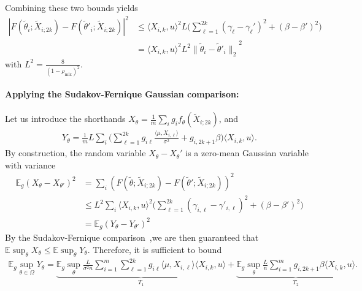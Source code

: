 \documentclass[twoside,11pt]{article}
\def\EE{ \mathbb{E} }
\newcommand{\norm}[1]{\ensuremath{\|#1\|_2}}
\newcommand{\mixcoef}{\ensuremath{\rho_{\mathrm{mix}}}}
\newcommand{\paramobs}{\mu}
\newcommand{\paramtrans}{\beta}
\newcommand{\paramjoint}{\theta}
\newcommand{\paramspacejoint}{\DomTheta}
\newcommand{\paramgamma}{\gamma}
\newcommand{\DomTheta}{\ensuremath{\Omega}}
\newcommand{\Xtil}{\ensuremath{\widetilde{X}}}
\newcommand{\funcproc}{f_{\paramjoint}}
\newcommand{\funcprocgamma}[1]{F(#1;\blockXi)}
\newcommand{\blockXi}{\Xtil_{i;2k}}
\newcommand{\lipcont}{\ensuremath{L}}
\newcommand{\paramjointgamma}{\tilde{\paramjoint}}
\begin{document}
Combining these two bounds yields
\begin{align*}
|\funcprocgamma{\paramjointgamma_i} -
\funcprocgamma{\paramjointgamma'_i}|^2 &\leq \langle X_{i,k},u
\rangle^2 \lipcont \big(\sum_{\ell=1}^{2k} (\paramgamma_\ell -
\paramgamma_\ell')^2 + (\paramtrans-\paramtrans')^2\big) \\
&= \langle
X_{i,k},u\rangle^2 \lipcont^2 \norm{\paramjointgamma_i -
  \paramjointgamma'_i}^2
\end{align*}
with $ \lipcont^2 = \frac{8}{(1-\mixcoef)^2}$.


\paragraph{Applying the Sudakov-Fernique Gaussian comparison:} 

Let us introduce the shorthands \mbox{$X_\paramjoint = \frac{1}{m}
  \sum_i g_i \funcproc(\blockXi)$,} and
\begin{align*}
Y_{\paramjoint} = \frac{1}{m} \lipcont \sum_i \big(\sum_{\ell=1}^{2k}
g_{i \ell} \frac{\langle \paramobs, X_{i,\ell} \rangle}{\sigma^2} +
g_{i,2k+1} \paramtrans \big) \langle X_{i,k}, u\rangle.
\end{align*}
By construction, the random variable $X_\paramjoint - X_\paramjoint'$
is a zero-mean Gaussian variable with variance
\begin{align}
\EE_g (X_{\paramjoint}-X_{\paramjoint'})^2 &= \sum_i
(\funcprocgamma{\paramjointgamma} -
\funcprocgamma{\paramjointgamma'})^2 \nonumber\\ &\leq \lipcont^2
\sum_i \langle X_{i,k},u\rangle^2 \big( \sum_{\ell=1}^{2k}
(\paramgamma_{i,\ell} - \paramgamma'_{i,\ell})^2 +
(\paramtrans-\paramtrans')^2 \big) \nonumber\\ &= \EE_g
(Y_{\paramjoint} - Y_{\paramjoint'})^2
\end{align}
%
By the Sudakov-Fernique comparison~\cite{LedTalBanach},we are then
guaranteed that $\EE \sup_{\paramjoint} X_{\paramjoint} \leq \EE
\sup_{\paramjoint} Y_{\paramjoint}$.  Therefore, it is sufficient to
bound
\begin{align*}
\EE_g\sup_{\paramjoint\in\paramspacejoint} Y_{\paramjoint}=
\underbrace{\EE_g \sup_{\paramjoint} \frac{\lipcont}{\sigma^2 n}
  \sum_{i=1}^m \sum_{\ell=1}^{2k} g_{i \ell} \langle \paramobs,
  X_{i,\ell} \rangle\langle X_{i,k}, u\rangle}_{T_1} +
\underbrace{\EE_g \sup_{\paramjoint} \frac{\lipcont}{n}\sum_{i=1}^m
  g_{i,2k+1} \paramtrans \langle X_{i,k}, u\rangle}_{T_2}.
\end{align*}
\end{document}
